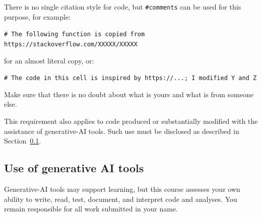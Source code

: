 \documentclass[a4paper,10pt,twocolumn]{report}
\begin{document}
There is no single citation style for code, but \texttt{\#comments} can be used for this purpose, for example:

\texttt{\# The following function is copied from https://stackoverflow.com/XXXXX/XXXXX}

for an almost literal copy, or:

\texttt{\# The code in this cell is inspired by https://...; I modified Y and Z}

Make sure that there is no doubt about what is yours and what is from someone else.

This requirement also applies to code produced or substantially modified with
the assistance of generative-AI tools. Such use must be disclosed as described
in Section~\ref{sec:generative-ai}.

\subsection{Use of generative AI tools}
\label{sec:generative-ai}

Generative-AI tools may support learning, but this course assesses your own ability to write, read, test, document, and interpret code and analyses. You remain responsible for all work submitted in your name.
\end{document}
